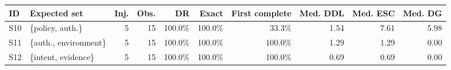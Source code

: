 \begin{tabular}{@{}llrrrrrrrr@{}}
\toprule
ID & Expected set & Inj. & Obs. & DR & Exact & First complete & Med. DDL & Med. ESC & Med. DG \\
\midrule
S10 & \{policy, auth.\} & 5 & 15 & 100.0\% & 100.0\% & 33.3\% & 1.54 & 7.61 & 5.98 \\
S11 & \{auth., environment\} & 5 & 15 & 100.0\% & 100.0\% & 100.0\% & 1.29 & 1.29 & 0.00 \\
S12 & \{intent, evidence\} & 5 & 15 & 100.0\% & 100.0\% & 100.0\% & 0.69 & 0.69 & 0.00 \\
\bottomrule
\end{tabular}
